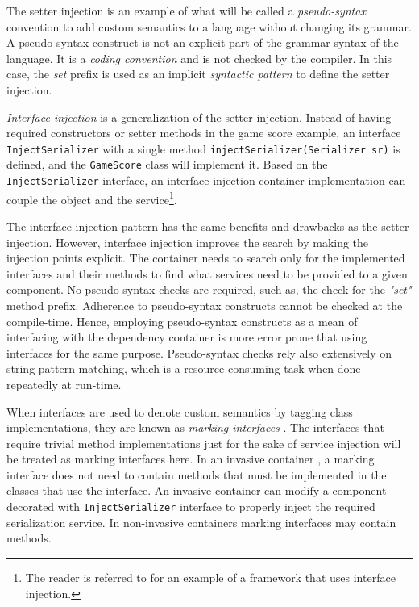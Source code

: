 \begin{dinglist}{43}
The setter injection is an example of what will be called a \textit{pseudo-syntax} convention to add custom semantics to a language  without changing its grammar. A pseudo-syntax construct is not an explicit part of the grammar syntax of the language. It is a \textit{coding convention} and is not checked by the compiler. In this case, the \textit{set} prefix is used as an implicit \textit{syntactic pattern} to define the setter injection. 

\item \textit{Interface injection} is a generalization of the setter injection. Instead of having required constructors or setter methods in the game score example, an interface \texttt{In\-ject\-Se\-ria\-li\-zer} with a single method \texttt{in\-jectSe\-ria\-li\-zer(Se\-ria\-li\-zer sr)} is defined, and the \texttt{Ga\-me\-Sco\-re} class will implement it. Based on the \texttt{In\-jectSe\-ria\-li\-zer} interface, an interface injection container implementation can couple the object and the service\footnote{The reader is referred to \cite{fowler.ioc.04} for an example of a framework that uses interface injection.}.

The interface injection pattern has the same benefits and drawbacks as the setter injection.
However, interface injection improves the search by making the injection points explicit. The container needs to search only for the implemented interfaces and their methods to find what services need to be provided to a given component. No pseudo-syntax checks are required, such as, the check for the \textit{"set"} method prefix. Adherence to pseudo-syntax constructs cannot be checked at the compile-time. Hence, employing pseudo-syntax constructs as a mean of interfacing with the dependency container is more error prone that using interfaces for the same purpose. Pseudo-syntax checks rely also extensively on string pattern matching, which is a resource consuming task when done repeatedly at run-time.

When interfaces are used to denote custom semantics by tagging class implementations, they are known as \textit{marking interfaces} \cite{design.attrib}. The interfaces that require trivial method implementations just for the sake of service injection will be treated as marking interfaces here. In an invasive container , a marking interface does not need to contain methods that must be implemented in the classes that use the interface. An invasive container can modify a component decorated with \texttt{In\-ject\-Se\-ria\-li\-zer} interface to properly inject the required serialization service. In non-invasive containers marking interfaces may contain methods. 


\end{dinglist}
